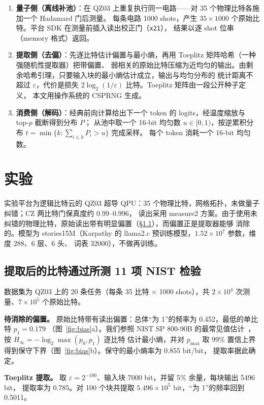 \documentclass[11pt]{article}
\begin{document}
\begin{enumerate}
  \item \textbf{量子侧（离线补池）}：在 QZ03 上重复执行同一电路——对 35 个物理比特各施加一个 Hadamard 门后测量。%
        每条电路 1000 shots，产生 $35\times1000$ 个原始比特。平台 SDK 在测量前插入读出校正门（\texttt{x21}），%
        结果以逐 shot 位串（memory 格式）返回。
  \item \textbf{提取侧（去偏）}：先逐比特估计偏置与最小熵，再用 Toeplitz 矩阵哈希（一种强随机性提取器）把带偏置、%
        弱相关的原始比特压缩为近均匀的输出。由剩余哈希引理，只要输入块的最小熵估计成立，输出与均匀分布的%
        统计距离不超过 $\varepsilon$，代价是损失 $2\log_2(1/\varepsilon)$ 比特。Toeplitz 矩阵由一段公开种子定义，%
        本文用操作系统的 CSPRNG 生成。
  \item \textbf{消费侧（解码）}：经典前向计算给出下一个 token 的 logits，经温度缩放与 top-$p$ 截断得到分布 $P$；%
        从池中取一个 16-bit 均匀数 $u\in[0,1)$，按逆累积分布 $t=\min\{k:\sum_{i\le k}P_i>u\}$ 完成采样。%
        每个 token 消耗一个 16-bit 均匀数。
\end{enumerate}

\section{实验}
实验平台为逻辑比特云的 QZ03 超导 QPU：35 个物理比特，网格拓扑，未做量子纠错；CZ 两比特门保真度约 0.99--0.996，%
读出采用 measure2 方案。由于使用未纠错的物理比特，原始读出带有明显偏置（\S\ref{sec:rng}），而偏置正是提取器能够%
消除的。模型为 stories15M（Karpathy 的 llama2.c 预训练模型，$1.52\times10^7$ 参数，维度 288、6 层、6 头、%
词表 32000），不做再训练。

\subsection{提取后的比特通过所测 11 项 NIST 检验}
\label{sec:rng}
数据集为 QZ03 上的 20 条任务（每条 35 比特 $\times$ 1000 shots），共 $2\times10^4$ 次测量、$7\times10^5$ 个原始比特。

\textbf{待消除的偏置。} 原始比特带有读出偏置：总体“为 1”的频率为 0.452，最低的单比特 $p_1=0.179$
（图~\ref{fig:bias}a）。我们参照 NIST SP 800-90B 的最常见值估计~\cite{nist90b}，按 $H_\infty=-\log_2\max(p_0,p_1)$ 逐比特%
估计最小熵，并对 $p_{\max}$ 取 99\% 置信上界得到保守下界（图~\ref{fig:bias}b）。保守的最小熵率为 0.855 bit/bit，%
提取率据此确定。

\textbf{Toeplitz 提取。} 取 $\varepsilon=2^{-100}$、输入块 7000 bit，并留 5\% 余量，每块输出 5496 bit，%
提取率为 0.785。对 100 个块共提取 $5.496\times10^5$ bit，“为 1”的频率回到 0.5011。
\end{document}
